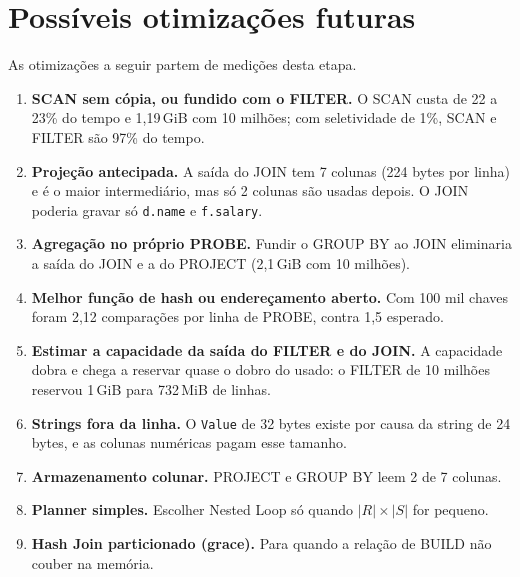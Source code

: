 \documentclass[11pt,a4paper]{article}
\begin{document}
\section{Possíveis otimizações futuras}\label{sec:otimizacoes}
As otimizações a seguir partem de medições desta etapa.
\begin{enumerate}
    \item \textbf{SCAN sem cópia, ou fundido com o FILTER.} O SCAN custa de 22 a 23\% do tempo e 1,19\,GiB com 10 milhões; com seletividade de 1\%, SCAN e FILTER são 97\% do tempo.
    \item \textbf{Projeção antecipada.} A saída do JOIN tem 7 colunas (224 bytes por linha) e é o maior intermediário, mas só 2 colunas são usadas depois. O JOIN poderia gravar só \texttt{d.name} e \texttt{f.salary}.
    \item \textbf{Agregação no próprio PROBE.} Fundir o GROUP BY ao JOIN eliminaria a saída do JOIN e a do PROJECT (2,1\,GiB com 10 milhões).
    \item \textbf{Melhor função de hash ou endereçamento aberto.} Com 100 mil chaves foram 2,12 comparações por linha de PROBE, contra 1,5 esperado.
    \item \textbf{Estimar a capacidade da saída do FILTER e do JOIN.} A capacidade dobra e chega a reservar quase o dobro do usado: o FILTER de 10 milhões reservou 1\,GiB para 732\,MiB de linhas.
    \item \textbf{Strings fora da linha.} O \texttt{Value} de 32 bytes existe por causa da string de 24 bytes, e as colunas numéricas pagam esse tamanho.
    \item \textbf{Armazenamento colunar.} PROJECT e GROUP BY leem 2 de 7 colunas.
    \item \textbf{Planner simples.} Escolher Nested Loop só quando $|R| \times |S|$ for pequeno.
    \item \textbf{Hash Join particionado (grace).} Para quando a relação de BUILD não couber na memória.
\end{enumerate}
\end{document}
